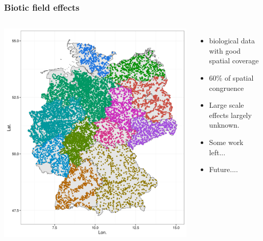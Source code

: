 \documentclass[
	12pt
	]{beamer}
\begin{document}
\begin{frame}
\frametitle{Biotic field effects}
	\begin{columns}
	    	    	\includegraphics[width=\textwidth, keepaspectratio]{figs/mzb_map.png}
	    \begingroup
		\footnotesize %
	        \begin{itemize}
	        	\item biological data with good spatial coverage
	        	\item 60\% of spatial congruence 
	        	\item Large scale effects largely unknown.
	        	\item Some work left...
	        	\item Future....
	        \end{itemize}
	       \endgroup
	\end{columns}

\end{frame}
\end{document}
